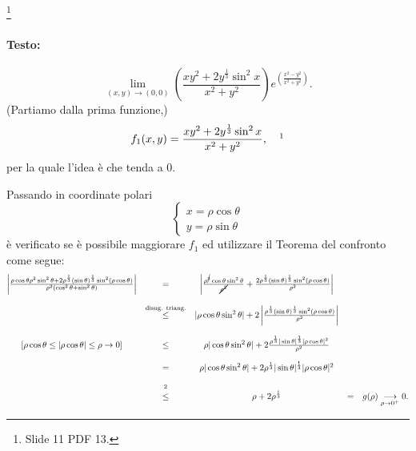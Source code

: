 \begin{example}\footnote{Slide 11 PDF 13.}
	\paragraph{Testo:}
	\begin{equation*}
		\lim_{(x,y)\rightarrow(0,0)}\left(\frac{xy^2+2y^{\frac{1}{3}}\sin^2x}{x^2+y^2}\right)e^{\left(\frac{x^2-y^2}{x^2+y^2}\right)}.
	\end{equation*}
	(Partiamo dalla prima funzione,)
	\begin{equation*}
		f_1(x,y) = \frac{xy^2+2y^{\frac{1}{3}}\sin^2x}{x^2+y^2},\quad \footnotemark
	\end{equation*}
	per la quale l'idea è che tenda a 0. 
	
	\noindent Passando in coordinate polari
	\begin{equation*}
		\begin{cases}
			x = \rho \cos\theta\\
			y = \rho \sin\theta
		\end{cases}
	\end{equation*}
	è verificato se è possibile maggiorare $f_1$ ed utilizzare il Teorema del confronto come segue:
	\begin{equation*}
		\begin{matrix}
				\left|\frac{\rho\cos\theta\rho^2\sin^2\theta + 2\rho^{\frac{1}{3}}(\sin\theta)^{\frac{1}{3}}\sin^2(\rho\cos\theta)}{\rho^2(\cos^2\theta+\sin^2\theta)}\right| &=& \left|\frac{\rho^{\cancel 3}\cos\theta\sin^2\theta}{\cancel{\rho^2}} + \frac{ 2\rho^{\frac{1}{3}}(\sin\theta)^{\frac{1}{3}}\sin^2(\rho\cos\theta)}{\rho^2}\right|\\\\
				&\overset{\text{disug. triang.}}{\leq}& |\rho \cos\theta\sin^2\theta| + 2 \left| \frac{ \rho^{\frac{1}{3}}(\sin\theta)^{\frac{1}{3}}\sin^2(\rho\cos\theta)}{\rho^2}\right|\\\\
				[\rho\cos\theta\leq|\rho\cos\theta|\leq\rho\rightarrow 0] &\leq& \rho |\cos\theta\sin^2\theta| + 2  \frac{ \rho^{\frac{1}{3}} |\sin\theta|^{\frac{1}{3}}|\rho\cos\theta|^2}{\rho^2}\\\\
				&=&  \rho |\cos\theta\sin^2\theta| + 2 \rho^{\frac{1}{3}} |\sin\theta|^{\frac{1}{3}}|\rho\cos\theta|^2\\\\
				&\overset{\footnotemark}{\leq}& \rho + 2\rho^{\frac{1}{3}} &=& g(\rho) \underset{\rho\rightarrow 0^+}{\longrightarrow} 0.
		\end{matrix}
	\end{equation*}
	

\end{example}
